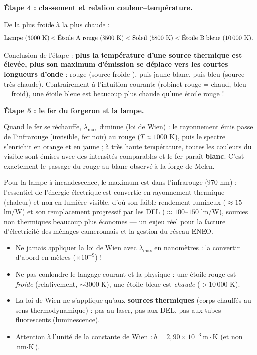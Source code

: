 \documentclass[11pt]{article}
\begin{document}
\begin{exoresolu}
\textbf{Étape 4 : classement et relation couleur--température.}

De la plus froide à la plus chaude :
\[ \text{Lampe (3000 K)} < \text{Étoile A rouge (3500 K)} < \text{Soleil (5800 K)} < \text{Étoile B bleue (10\,000 K)}. \]

Conclusion de l'étape : \textbf{plus la température d'une source thermique est élevée, plus son maximum d'émission se déplace vers les courtes longueurs d'onde} : rouge (source \og froide \fg), puis jaune-blanc, puis bleu (source très chaude). Contrairement à l'intuition courante (robinet rouge = chaud, bleu = froid), une étoile bleue est beaucoup plus chaude qu'une étoile rouge !

\textbf{Étape 5 : le fer du forgeron et la lampe.}

Quand le fer se réchauffe, $\lambda_{\max}$ diminue (loi de Wien) : le rayonnement émis passe de l'infrarouge (invisible, fer noir) au rouge ($T \approx 1000$ K), puis le spectre s'enrichit en orange et en jaune ; à très haute température, toutes les couleurs du visible sont émises avec des intensités comparables et le fer paraît \textbf{blanc}. C'est exactement le passage du rouge au blanc observé à la forge de Melen.

Pour la lampe à incandescence, le maximum est dans l'infrarouge ($970$ nm) : l'essentiel de l'énergie électrique est convertie en rayonnement thermique (chaleur) et non en lumière visible, d'où son faible rendement lumineux ($\approx 15$ lm/W) et son remplacement progressif par les DEL ($\approx 100$--$150$ lm/W), sources non thermiques beaucoup plus économes — un enjeu réel pour la facture d'électricité des ménages camerounais et la gestion du réseau \textsc{ENEO}.
\end{exoresolu}

\begin{attention}
\begin{itemize}
\item Ne jamais appliquer la loi de Wien avec $\lambda_{\max}$ en nanomètres : la convertir d'abord en mètres ($ \times 10^{-9} $) !
\item Ne pas confondre le langage courant et la physique : une étoile rouge est \emph{froide} (relativement, $\sim 3000$ K), une étoile bleue est \emph{chaude} ($> 10\,000$ K).
\item La loi de Wien ne s'applique qu'aux \textbf{sources thermiques} (corps chauffés au sens thermodynamique) : pas au laser, pas aux DEL, pas aux tubes fluorescents (luminescence).
\item Attention à l'unité de la constante de Wien : $b = 2,90 \times 10^{-3}\ \text{m}\cdot\text{K}$ (et non $\text{nm}\cdot\text{K}$).
\end{itemize}
\end{attention}
\end{document}
